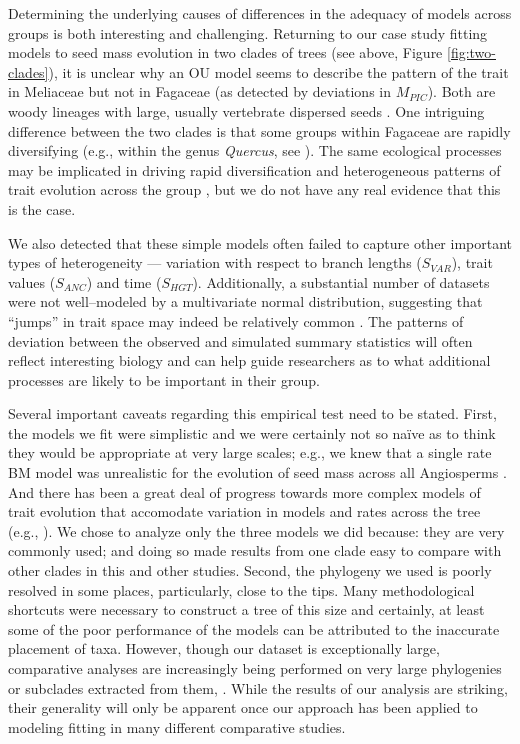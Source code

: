 \documentclass[a4paper,12pt]{article}
\begin{document}
Determining the underlying causes of differences in the adequacy of models across groups is both interesting and challenging. Returning to our case study fitting models to seed mass evolution in two clades of trees (see above, Figure \ref{fig:two-clades}), it is unclear why an OU model seems to describe the pattern of the trait in Meliaceae but not in Fagaceae (as detected by deviations in $M_{PIC}$). Both are woody lineages with large, usually vertebrate dispersed seeds \citep{Pannell1987, Manos2001}. One intriguing difference between the two clades is that some groups within Fagaceae are rapidly diversifying (e.g., within the genus \emph{Quercus}, see \citep{Simeone2013}). The same ecological processes may be implicated in driving rapid diversification and heterogeneous patterns of trait evolution across the group \citep{Schluter2000}, but we do not have any real evidence that this is the case. 

We also detected that these simple models often failed to capture other important types of heterogeneity --- variation with respect to branch lengths ($S_{VAR}$), trait values ($S_{ANC}$) and time ($S_{HGT}$). Additionally, a substantial number of datasets were not well--modeled by a multivariate normal distribution, suggesting that ``jumps'' in trait space may indeed be relatively common \citep{Landis2012, PennellPE}. The patterns of deviation between the observed and simulated summary statistics will often reflect interesting biology and can help guide researchers as to what additional processes are likely to be important in their group.

Several important caveats regarding this empirical test need to be stated. First, the models we fit were simplistic and we were certainly not so na\"{i}ve as to think they would be appropriate at very large scales; e.g., we knew that a single rate BM model was unrealistic for the evolution of seed mass across all Angiosperms \citep{Moles2005}. And there has been a great deal of progress towards more complex models of trait evolution that accomodate variation in models and rates across the tree (e.g., \citep{ButlerKing2004, Omeara2006, Eastman2011, Beaulieu2012, SlaterMEE, UyedaBayou}). We chose to analyze only the three models we did because: they are very commonly used; and doing so made results from one clade easy to compare with other clades in this and other studies. Second, the phylogeny we used is poorly resolved in some places, particularly, close to the tips. Many methodological shortcuts were necessary to construct a tree of this size and certainly, at least some of the poor performance of the models can be attributed to the inaccurate placement of taxa. However, though our dataset is exceptionally large, comparative analyses are increasingly being performed on very large phylogenies or subclades extracted from them, \citep{Coopermammal, Jetz2012, Rabosky2013, PyronBurbrink2013, ksi}. While the results of our analysis are striking, their generality will only be apparent once our approach has been applied to modeling fitting in many different comparative studies.
\end{document}
